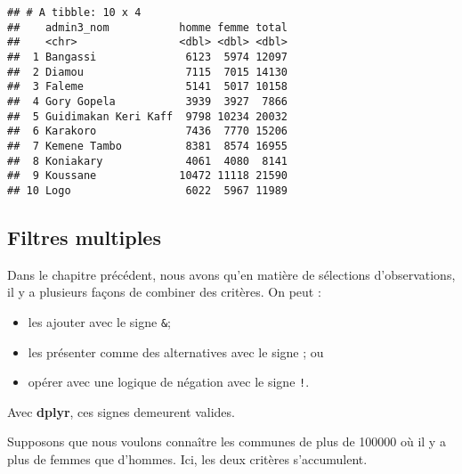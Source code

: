 \documentclass[]{book}
\newenvironment{Shaded}{\begin{snugshade}}{\end{snugshade}}
\newcommand{\KeywordTok}[1]{\textcolor[rgb]{0.13,0.29,0.53}{\textbf{#1}}}
\newcommand{\DecValTok}[1]{\textcolor[rgb]{0.00,0.00,0.81}{#1}}
\newcommand{\StringTok}[1]{\textcolor[rgb]{0.31,0.60,0.02}{#1}}
\newcommand{\CommentTok}[1]{\textcolor[rgb]{0.56,0.35,0.01}{\textit{#1}}}
\newcommand{\OperatorTok}[1]{\textcolor[rgb]{0.81,0.36,0.00}{\textbf{#1}}}
\newcommand{\NormalTok}[1]{#1}
\begin{document}
\begin{verbatim}
## # A tibble: 10 x 4
##    admin3_nom           homme femme total
##    <chr>                <dbl> <dbl> <dbl>
##  1 Bangassi              6123  5974 12097
##  2 Diamou                7115  7015 14130
##  3 Faleme                5141  5017 10158
##  4 Gory Gopela           3939  3927  7866
##  5 Guidimakan Keri Kaff  9798 10234 20032
##  6 Karakoro              7436  7770 15206
##  7 Kemene Tambo          8381  8574 16955
##  8 Koniakary             4061  4080  8141
##  9 Koussane             10472 11118 21590
## 10 Logo                  6022  5967 11989
\end{verbatim}

\subsection{Filtres multiples}\label{filtres-multiples}

Dans le chapitre précédent, nous avons qu'en matière de sélections
d'observations, il y a plusieurs façons de combiner des critères. On
peut :

\begin{itemize}
\item
  les ajouter avec le signe \texttt{\&};
\item
  les présenter comme des alternatives avec le signe
  \texttt{\textbar{}}; ou
\item
  opérer avec une logique de négation avec le signe \texttt{!}.
\end{itemize}

Avec \textbf{dplyr}, ces signes demeurent valides.

Supposons que nous voulons connaître les communes de plus de 100000 où
il y a plus de femmes que d'hommes. Ici, les deux critères s'accumulent.

\begin{Shaded}
\end{Shaded}
\end{document}
